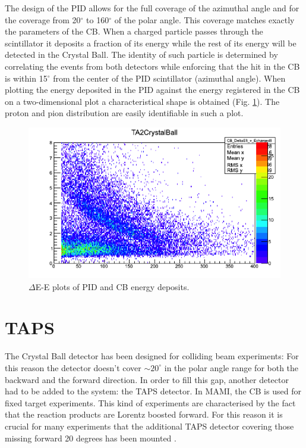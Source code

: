 \indent The design of the PID allows for the full coverage of the azimuthal angle and for the coverage from 20$^{\circ}$ to 160$^{\circ}$ of the polar angle. This coverage matches exactly the parameters of the CB. When  a  charged  particle  passes  through  the  scintillator  it  deposits  a fraction of its energy while the rest of its energy will be detected in the Crystal Ball. The identity  of  such  particle  is  determined  by  correlating  the  events  from  both detectors while enforcing that the hit in the CB is within 15$^{\circ}$ from the center of the PID scintillator (azimuthal angle). When plotting the energy deposited in the PID against the energy registered in the CB on a two-dimensional plot a characteristical shape is obtained (Fig. \ref{banana}). The proton and pion distribution are easily identifiable in such a plot.

\begin{figure}[H]
\begin{center}
\includegraphics[scale=0.8]{pictures/png/banana.png}
\caption{$\Delta$E-E plots of PID and CB energy deposits.}
\label{banana}
\end{center}
\end{figure}

\section{TAPS}

\indent The Crystal Ball detector has been designed for colliding beam experiments: For this reason the detector  doesn't  cover  $\sim 20^{\circ}$ in the polar  angle  range  for both the  backward  and  the forward direction. In order to fill this gap,  another detector had to be added to the system: the TAPS detector. In MAMI,  the  CB  is  used  for fixed  target  experiments. This kind of experiments are characterised by the fact that the reaction products are Lorentz boosted forward. For this reason it is crucial for many experiments that the additional TAPS detector  covering  those  missing  forward  20  degrees has  been  mounted \cite{novotny}.

